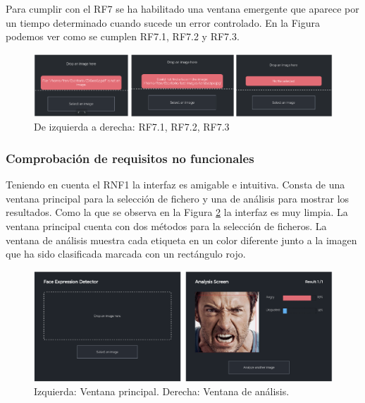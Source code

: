\documentclass[a4paper,11pt]{book}
\begin{document}
Para cumplir con el RF7 se ha habilitado una ventana emergente que aparece por un tiempo determinado cuando sucede un error controlado. En la Figura podemos ver como se cumplen RF7.1, RF7.2 y RF7.3.\\

\begin{figure}[h]
\centering
\includegraphics[width=1.0\linewidth]{imagenes/RF7}
\caption[RF7]{De izquierda a derecha: RF7.1, RF7.2, RF7.3}
\label{fig:RF7}
\end{figure}

\subsubsection{Comprobación de requisitos no funcionales}
Teniendo en cuenta el RNF1 la interfaz es amigable e intuitiva. Consta de una ventana principal para la selección de fichero y una de análisis para mostrar los resultados. Como la que se observa en la Figura \ref{fig:UI01} la interfaz es muy limpia. La ventana principal cuenta con dos métodos para la selección de ficheros. La ventana de análisis muestra cada etiqueta en un color diferente junto a la imagen que ha sido clasificada marcada con un rectángulo rojo.\\
\begin{figure}[h]
	\centering
	\includegraphics[width=0.9\linewidth]{imagenes/UI01}
	\caption[Interfaz de usuario]{Izquierda: Ventana principal. Derecha: Ventana de análisis.}
	\label{fig:UI01}
\end{figure}
\end{document}
